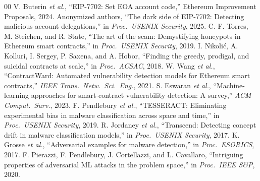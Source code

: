 \documentclass[conference]{IEEEtran}
\newcommand{\eip}{EIP-7702}
\begin{document}
\balance
\begin{thebibliography}{00}
 V. Buterin \emph{et al.}, ``EIP-7702: Set EOA account code,'' Ethereum
Improvement Proposals, 2024.
 Anonymized authors, ``The dark side of \eip{}: Detecting malicious account
delegations,'' in \emph{Proc.\ USENIX Security}, 2025.
 C. F. Torres, M. Steichen, and R. State, ``The art of the scam: Demystifying
honeypots in Ethereum smart contracts,'' in \emph{Proc.\ USENIX Security}, 2019.
 I. Nikoli\'c, A. Kolluri, I. Sergey, P. Saxena, and A. Hobor, ``Finding the greedy,
prodigal, and suicidal contracts at scale,'' in \emph{Proc.\ ACSAC}, 2018.
 W. Wang \emph{et al.}, ``ContractWard: Automated vulnerability detection
models for Ethereum smart contracts,'' \emph{IEEE Trans.\ Netw.\ Sci.\ Eng.}, 2021.
 S. Eswaran \emph{et al.}, ``Machine-learning approaches for smart-contract
vulnerability detection: A survey,'' \emph{ACM Comput.\ Surv.}, 2023.
 F. Pendlebury \emph{et al.}, ``TESSERACT: Eliminating experimental bias in
malware classification across space and time,'' in \emph{Proc.\ USENIX Security}, 2019.
 R. Jordaney \emph{et al.}, ``Transcend: Detecting concept drift in malware
classification models,'' in \emph{Proc.\ USENIX Security}, 2017.
 K. Grosse \emph{et al.}, ``Adversarial examples for malware detection,'' in
\emph{Proc.\ ESORICS}, 2017.
 F. Pierazzi, F. Pendlebury, J. Cortellazzi, and L. Cavallaro, ``Intriguing
properties of adversarial ML attacks in the problem space,'' in \emph{Proc.\ IEEE S\&P}, 2020.
\end{thebibliography}
\end{document}
